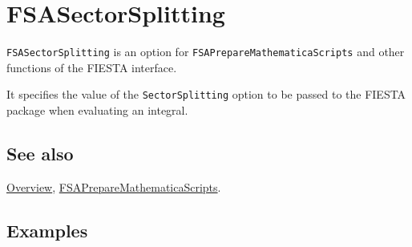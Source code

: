 \documentclass[../FeynHelpersManual.tex]{subfiles}
\begin{document}
\begin{Shaded}
\begin{Highlighting}[]
 
\end{Highlighting}
\end{Shaded}

\hypertarget{fsasectorsplitting}{
\section{FSASectorSplitting}\label{fsasectorsplitting}}

\texttt{FSASectorSplitting} is an option for
\texttt{FSAPrepareMathematicaScripts} and other functions of the FIESTA
interface.

It specifies the value of the \texttt{SectorSplitting} option to be
passed to the FIESTA package when evaluating an integral.

\subsection{See also}

\hyperlink{toc}{Overview},
\hyperlink{fsapreparemathematicascripts}{FSAPrepareMathematicaScripts}.

\subsection{Examples}
\end{document}
